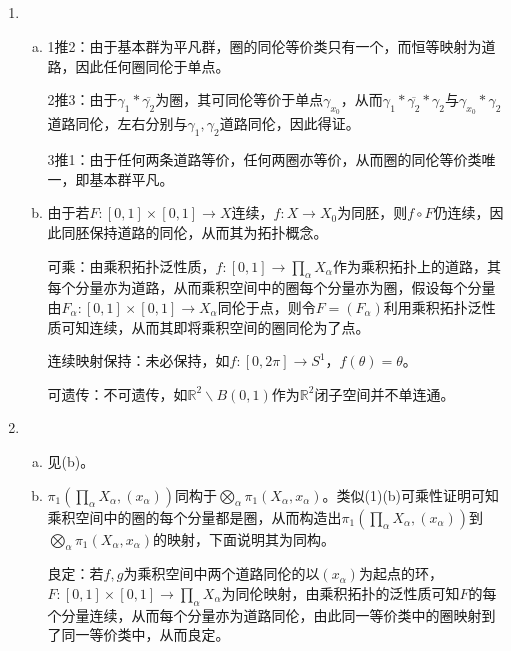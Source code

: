 \documentclass[a4paper,UTF8,fontset=windows]{ctexart}
\begin{document}
\subsection{}
\begin{enumerate}[(1)]
    \item
    \begin{enumerate}[(a)]
    \item
    1推2：由于基本群为平凡群，圈的同伦等价类只有一个，而恒等映射为道路，因此任何圈同伦于单点。
    
    2推3：由于$\gamma_1*\overline{\gamma_2}$为圈，其可同伦等价于单点$\gamma_{x_0}$，从而$\gamma_1*\overline{\gamma_2}*\gamma_2$与$\gamma_{x_0}*\gamma_2$道路同伦，左右分别与$\gamma_1,\gamma_2$道路同伦，因此得证。
    
    3推1：由于任何两条道路等价，任何两圈亦等价，从而圈的同伦等价类唯一，即基本群平凡。
    
    \item
    由于若$F:[0,1]\times [0,1]\to X$连续，$f:X\to X_0$为同胚，则$f\circ F$仍连续，因此同胚保持道路的同伦，从而其为拓扑概念。
    
    可乘：由乘积拓扑泛性质，$f:[0,1]\to\prod_\alpha X_\alpha$作为乘积拓扑上的道路，其每个分量亦为道路，从而乘积空间中的圈每个分量亦为圈，假设每个分量由$F_\alpha:[0,1]\times [0,1]\to X_\alpha$同伦于点，则令$F=(F_\alpha)$利用乘积拓扑泛性质可知连续，从而其即将乘积空间的圈同伦为了点。
    
    连续映射保持：未必保持，如$f:[0,2\pi]\to S^1$，$f(\theta)=\theta$。
    
    可遗传：不可遗传，如$\mathbb{R}^2\backslash B(0,1)$作为$\mathbb{R}^2$闭子空间并不单连通。
    \end{enumerate}
    
    \item
    \begin{enumerate}[(a)]
    \item
    见(b)。
    
    \item
    $\pi_1(\prod_\alpha X_\alpha,(x_\alpha))$同构于$\bigotimes_\alpha\pi_1(X_\alpha,x_\alpha)$。类似(1)(b)可乘性证明可知乘积空间中的圈的每个分量都是圈，从而构造出$\pi_1(\prod_\alpha X_\alpha,(x_\alpha))$到$\bigotimes_\alpha\pi_1(X_\alpha,x_\alpha)$的映射，下面说明其为同构。
    
    良定：若$f,g$为乘积空间中两个道路同伦的以$(x_\alpha)$为起点的环，$F:[0,1]\times[0,1]\to\prod_\alpha X_\alpha$为同伦映射，由乘积拓扑的泛性质可知$F$的每个分量连续，从而每个分量亦为道路同伦，由此同一等价类中的圈映射到了同一等价类中，从而良定。
    

\end{enumerate}
\end{enumerate}
\end{document}
